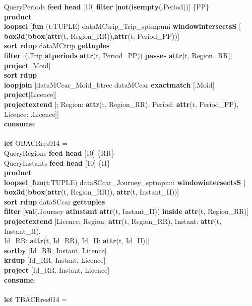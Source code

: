 \documentclass[a4paper]{article}
\newcommand{\op}[1]{\textbf{#1}}
\begin{document}
\begin{scriptsize}
\begin{tabbing}
\>QueryPeriods \op{feed head} [10] \op{filter} [\op{not}(\op{isempty}(.Period))] \{PP\}\\
\>\op{product}\\
\>\op{loopsel} [\op{fun} (t:TUPLE) dataMCtrip\_Trip\_sptmpuni \op{windowintersectsS} [\\
\>\>\>\>\op{box3d}(\op{bbox}(\op{attr}(t, Region\_RR)),\op{attr}(t, Period\_PP))]\\
\>\>\op{sort rdup} dataMCtrip \op{gettuples}\\
\>\>\op{filter} [(.Trip \op{atperiods} \op{attr}(t, Period\_PP)) \op{passes} \op{attr}(t, Region\_RR)]\\
\>\>\op{project} [Moid]\\
\>\>\op{sort rdup}\\
\>\>\op{loopjoin} [dataMCcar\_Moid\_btree dataMCcar \op{exactmatch} [.Moid] \op{project}[Licence]]\\
\>\>\op{projectextend} [; Region: \op{attr}(t, Region\_RR), Period: \op{attr}(t, Period\_PP), Licence: .Licence]]\\
\op{consume};\\
\\
\op{let} OBACRres014 =\\
\>QueryRegions  \op{feed head} [10] \{RR\}\\
\>QueryInstants \op{feed head} [10] \{II\}\\
\>\op{product}\\
\>\op{loopsel} [\op{fun}(t:TUPLE) dataSCcar\_Journey\_sptmpuni \op{windowintersectsS} [\\ 
\>\>\>\>\op{box3d}(\op{bbox}(\op{attr}(t, Region\_RR)), \op{attr}(t, Instant\_II))]\\
\>\>\op{sort rdup} dataSCcar  \op{gettuples}\\
\>\>\op{filter} [\op{val}(.Journey \op{atinstant} \op{attr}(t, Instant\_II)) \op{inside} \op{attr}(t, Region\_RR)]\\
\>\>\op{projectextend} [Licence; Region: \op{attr}(t, Region\_RR), Instant: \op{attr}(t, Instant\_II),\\
\>\>\>\>Id\_RR: \op{attr}(t, Id\_RR), Id\_II: \op{attr}(t, Id\_II)]]\\
\>\op{sortby} [Id\_RR, Instant, Licence]\\
\>\op{krdup} [Id\_RR, Instant, Licence]\\
\>\op{project} [Id\_RR, Instant, Licence]\\
\op{consume};\\
\\
\op{let} TBACRres014 =\\

\end{tabbing}
\end{scriptsize}
\end{document}
